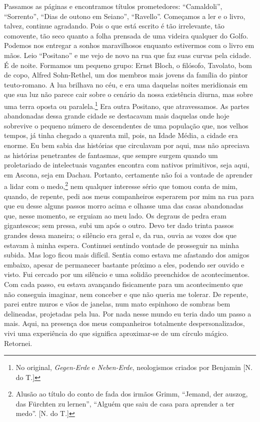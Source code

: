 Passamos as páginas e encontramos títulos prometedores: ``Camaldoli'',
``Sorrento'', ``Dias de outono em Seiano'', ``Ravello''. Começamos a ler
e o livro, talvez, continue agradando. Pois o que está escrito é tão
irrelevante, tão comovente, tão seco quanto a folha prensada de uma
videira qualquer do Golfo. Podemos nos entregar a sonhos maravilhosos
enquanto estivermos com o livro em mãos. Leio ``Positano'' e me vejo de
novo na rua que faz suas curvas pela cidade. É de noite. Formamos um
pequeno grupo: Ernst Bloch, o filósofo, Tavolato, bom de copo, Alfred
Sohn-Rethel, um dos membros mais jovens da família do pintor
teuto-romano. A lua brilhava no céu, e era uma daquelas noites
meridionais em que sua luz não parece cair sobre o cenário da nossa
existência diurna, mas sobre uma terra oposta ou paralela.\footnote{No
  original, \emph{Gegen-Erde} e \emph{Neben-Erde}, neologismos criados
  por Benjamin {[}N. do T.{]}} Era outra Positano, que atravessamos. As
partes abandonadas dessa grande cidade se destacavam mais daquelas onde
hoje sobrevive o pequeno número de descendentes de uma população que,
nos velhos tempos, já tinha chegado a quarenta mil, pois, na Idade
Média, a cidade era enorme. Eu bem sabia das histórias que circulavam
por aqui, mas não apreciava as histórias penetrantes de fantasmas, que
sempre surgem quando um proletariado de intelectuais vagantes encontra
com nativos primitivos, seja aqui, em Ascona, seja em Dachau. Portanto,
certamente não foi a vontade de aprender a lidar com o medo,\footnote{Alusão
  ao título do conto de fada dos irmãos Grimm, ``Jemand, der auszog, das
  Fürchten zu lernen'', ``Alguém que saiu de casa para aprender a ter
  medo''. {[}N. do T.{]}} nem qualquer interesse sério que tomou conta
de mim, quando, de repente, pedi aos meus companheiros esperarem por mim
na rua para que eu desse alguns passos morro acima e olhasse uma das
casas abandonadas que, nesse momento, se erguiam ao meu lado. Os degraus
de pedra eram gigantescos; sem pressa, subi um após o outro. Devo ter
dado trinta passos grandes dessa maneira; o silêncio era geral e, da
rua, ouvia as vozes dos que estavam à minha espera. Continuei sentindo
vontade de prosseguir na minha subida. Mas logo ficou mais difícil.
Sentia como estava me afastando dos amigos embaixo, apesar de permanecer
bastante próximo a eles, podendo ser ouvido e visto. Fui cercado por um
silêncio e uma solidão preenchidos de acontecimentos. Com cada passo, eu
estava avançando fisicamente para um acontecimento que não conseguia
imaginar, nem conceber e que não queria me tolerar. De repente, parei
entre muros e vãos de janelas, num mato espinhoso de sombras bem
delineadas, projetadas pela lua. Por nada nesse mundo eu teria dado um
passo a mais. Aqui, na presença dos meus companheiros totalmente
despersonalizados, vivi uma experiência do que significa aproximar-se de
um círculo mágico. Retornei.

